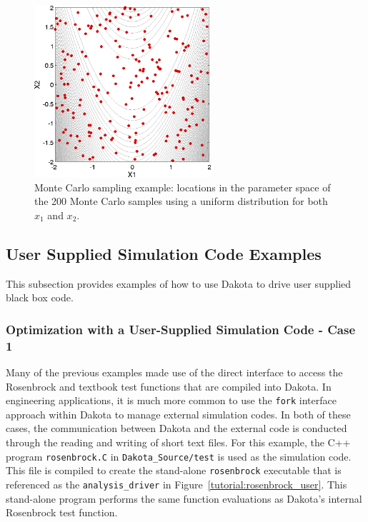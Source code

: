 \begin{figure}[ht!]
  \centering
  \includegraphics[height=2.5in]{images/rosen_nond_pts}
  \caption{Monte Carlo sampling example: locations in the parameter
    space of the 200 Monte Carlo samples using a uniform distribution
    for both $x_1$ and $x_2$.}
  \label{tutorial:rosenbrock_mc_points}
\end{figure}

\subsection{User Supplied Simulation Code Examples}\label{tutorial:examples:user_supply}
This subsection provides examples of how to use Dakota to drive user 
supplied black box code.

\subsubsection{Optimization with a User-Supplied Simulation Code - Case 1}\label{tutorial:examples:user_supply:optimization1}

Many of the previous examples made use of the direct interface to
access the Rosenbrock and textbook test functions that are compiled
into Dakota. In engineering applications, it is much more common to
use the \texttt{fork} interface approach within
Dakota to manage external simulation codes. In both of these cases,
the communication between Dakota and the external code is conducted
through the reading and writing of short text files. For this example,
the C++ program \texttt{rosenbrock.C} in \texttt{Dakota\_Source/test} is used
as the simulation code. This file is compiled to create the
stand-alone \texttt{rosenbrock} executable that is referenced as the
\texttt{analysis\_driver} in Figure~\ref{tutorial:rosenbrock_user}.
This stand-alone program performs the same function evaluations as
Dakota's internal Rosenbrock test function.

